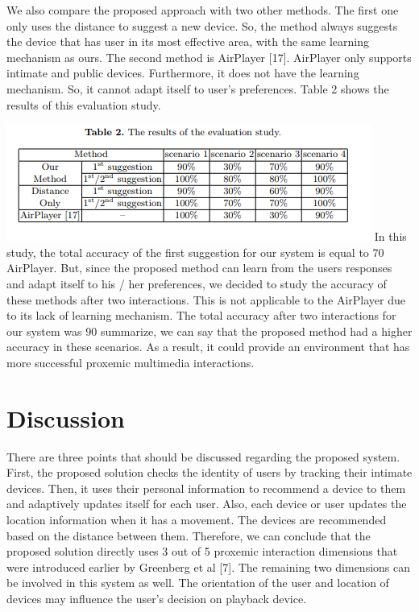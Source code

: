 \documentclass[runningheads,a4paper]{llncs}
\begin{document}
We also compare the proposed approach with two other methods. The first
one only uses the distance to suggest a new device. So, the method always suggests the device that has user in its most effective area, with the same learning
mechanism as ours. The second method is AirPlayer [17]. AirPlayer only supports intimate and public devices. Furthermore, it does not have the learning
mechanism. So, it cannot adapt itself to user’s preferences. Table 2 shows the
results of this evaluation study.

\includegraphics{table.png}
In this study, the total accuracy of the first suggestion for our system is
equal to 70%
AirPlayer. But, since the proposed method can learn from the users responses
and adapt itself to his / her preferences, we decided to study the accuracy of
these methods after two interactions. This is not applicable to the AirPlayer
due to its lack of learning mechanism. The total accuracy after two interactions
for our system was 90%
summarize, we can say that the proposed method had a higher accuracy in these
scenarios. As a result, it could provide an environment that has more successful
proxemic multimedia interactions. 
 


\section{Discussion}\label{references}
There are three points that should be discussed regarding the proposed system.
First, the proposed solution checks the identity of users by tracking their intimate devices. Then, it uses their personal information to recommend a device
to them and adaptively updates itself for each user. Also, each device or user
updates the location information when it has a movement. The devices are recommended based on the distance between them. Therefore, we can conclude that
the proposed solution directly uses 3 out of 5 proxemic interaction dimensions
that were introduced earlier by Greenberg et al [7]. The remaining two dimensions can be involved in this system as well. The orientation of the user and
location of devices may influence the user’s decision on playback device.
\end{document}
